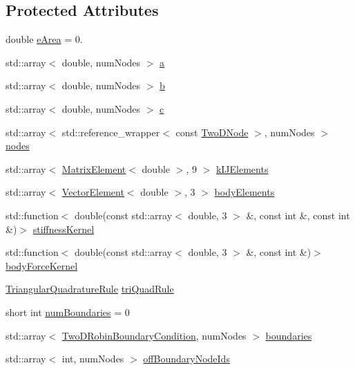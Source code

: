 \subsection*{Protected Attributes}
\begin{DoxyCompactItemize}
\item 
double \hyperlink{a00773_ab74cbf3ff783201003c53439f79307e4}{e\+Area} = 0.
\item 
std\+::array$<$ double, num\+Nodes $>$ \hyperlink{a00773_aad7071cc0cf8762bad7b59789b7bb5fc}{a}
\item 
std\+::array$<$ double, num\+Nodes $>$ \hyperlink{a00773_a75eeb5e4f9b5f6610b0e7112f8324b86}{b}
\item 
std\+::array$<$ double, num\+Nodes $>$ \hyperlink{a00773_ad9152e640f73a7b832ee6d45a1cce567}{c}
\item 
std\+::array$<$ std\+::reference\+\_\+wrapper$<$ const \hyperlink{a00198_a92dafcc05a788e1065a5792b67f0f70e}{Two\+D\+Node} $>$, num\+Nodes $>$ \hyperlink{a00773_add9415a1262a4d58136e1ef11507360b}{nodes}
\item 
std\+::array$<$ \hyperlink{a00198_a1a12603621e7a1efa59ac5cb79f9d509}{Matrix\+Element}$<$ double $>$, 9 $>$ \hyperlink{a00773_a9126763a046ac0736d72b6b5d20ba80d}{k\+I\+J\+Elements}
\item 
std\+::array$<$ \hyperlink{a00198_a08f01d4bb892cf7b2386d0f3a8643d72}{Vector\+Element}$<$ double $>$, 3 $>$ \hyperlink{a00773_a8a85094c0060a67aa1b6abf4a5e660a6}{body\+Elements}
\item 
std\+::function$<$ double(const std\+::array$<$ double, 3 $>$ \&, const int \&, const int \&)$>$ \hyperlink{a00773_ae2480b5335fe78245cb1006e3eeb034d}{stiffness\+Kernel}
\item 
std\+::function$<$ double(const std\+::array$<$ double, 3 $>$ \&, const int \&)$>$ \hyperlink{a00773_a48dbf56bce64a1e97332b03309720154}{body\+Force\+Kernel}
\item 
\hyperlink{a00869}{Triangular\+Quadrature\+Rule} \hyperlink{a00773_a5e50303ae2cfb783f44de143be8a9aac}{tri\+Quad\+Rule}
\item 
short int \hyperlink{a00773_a70ceb410983c87c36546a2a95306dac6}{num\+Boundaries} = 0
\item 
std\+::array$<$ \hyperlink{a00789}{Two\+D\+Robin\+Boundary\+Condition}, num\+Nodes $>$ \hyperlink{a00773_a3b9ec5bc80554d9ffcdd26248061c79f}{boundaries}
\item 
std\+::array$<$ int, num\+Nodes $>$ \hyperlink{a00773_ac9e146872421c7dbd60e08f887b0cfc0}{off\+Boundary\+Node\+Ids}
\end{DoxyCompactItemize}
